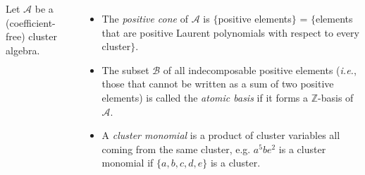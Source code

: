 \documentclass[a0paper, portrait, 17pt]{tikzposter}
\begin{document}
\begin{columns}

{
Let $\mathcal{A}$ be a (coefficient-free) cluster algebra.
\begin{itemize}
 \item The \emph{positive cone} of $\mathcal{A}$ is
 $\{$positive elements$\}$ = 
  $\{$elements that are positive Laurent polynomials %
 with respect to every cluster$\}$.
  
\item The subset $\mathcal{B}$ of all indecomposable positive elements (\textit{i.e.}, those that cannot be written as a sum of two positive elements)
is called the \emph{atomic basis} if it forms a $\mathbb{Z}$-basis of $\mathcal{A}$.

 
 \item A \emph{cluster monomial} is a product of cluster variables all coming from the same cluster,
e.g. $a^{5}be^2$ is a cluster monomial if $\{a,b,c,d,e \}$ is a cluster.

 \end{itemize}
 }

\end{columns}
\end{document}
